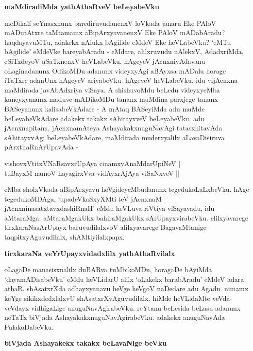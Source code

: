 {\bigskip
\noindent
{\large\bf maMdiradiMda yathAthaRveV beLeyabeVku}}\label{page69}
\medskip

\noindent
meDikalf seYnasxnunx barediruvudanenxV loVkada janaru Eke PAloV mADutAtxre taMtamamx aBipArxya\-vanenxV Eke PAloV mADabAradu? haqdayavuMTu, adakekx nAlukx bAgilide eMdeV Eke heVLabeVku? `eMTu bAgilide' eMdeVke bareyabAradu - eMdare, alilxruvudu nAlekxV, AdadxriMda, eSiTxdeyoV aSaTxnenxV heVLabeVku. hAgeyeV jAcnxniyAdavanu oLaginadanunx OdikoMDu adanunx videyxyAgi aBAyxsa mADalu horage iTaTxre adanUnx hAgeyeV ariyabeVku. hAgeyeV heVLabeVku. idu vijAcnxna maMdi\-rada javAbAdx\-riya viSaya. A shishuvoMdu beLedu videyxyeMba kaneyxyanunx maduve mADikoMDu tananx muMdina\- parxjege tananx BASeyanunx kalisabeVkAdare - A mAtaq BASeyiMda adu muMde beLeya\-beVkAdare adakekx takakx sAhitayxveV beLeyabeVku. adu jAcnxnapitana, jAcnxnamAteya AshayakakxnuguNavAgi tatasxhitavAda sAhitayxvAgi beLeyabeVkAdare, maMdirada muderxyalilx aLavaDisiruva pArxthaRnArUpavAda -

\begin{shloka}
vishovxVtitxVNaRsavxrUpAya cinamxyAnaMdarUpiNeV |\\\label{69}
tuBayxM namoV hayagirxVva vidAyxrAjAya viSaNxveV ||
\end{shloka}

\noindent
eMba sholxVkada aBipArxyavu heVgideyeMbudanunx tegedukoLaLxbeVku. hAge tegedukoMDAga, `upa\-deVkaSxyXMti teV jAcnxnaM\label{69} jAcnxninasatxtavxdashiRnaH' eMdu heVLuva riVtiya viSayavadu, idu aMtaraMga. aMta\-raMgakUkx bahiraMgakUkx sArUpayxvirabeVku. elilxyavarege tirxkaraNasArUpayx baruvudilalxvoV alilxya\-varege BagavaMtanige taqpitxyAguvudilalx, shAMtiyilalxpapx.

{\bigskip
\noindent
{\large\bf tirxkaraNa veYrUpayxvidadxlilx yathAthaRvilalx}}\label{page69}
\medskip

\noindent
oLagaDe manasisxnalilx duBARva tuMbikoMDu, horagaDe bAyiMda `dayamADisa\-beVku' eMdu heVLi\-darU alilx `oLakekx barabAradu' eMdeV adara athaR. shAsatxrXda adhayxyanavu heVge heVgoV naDe\-dare adu Agadu. nimamx keYge sikikxdedxlalxvU shAsatxrXvAguvudilalx. hiMde heVLidaMte veVda-veVdayx-vidhigaLige anu\-guNa\-vAgira\-beVku. reYtanu beLesida beLasu adanunx neTaTx biVjada AshayakakxnuguNavAgirabeVku. adakekx anuguNa\-vAda PalakoDabeVku.

{\bigskip
\noindent
{\large\bf biVjada Ashayakekx takakx beLavaNige beVku}}\label{page70}
\medskip


